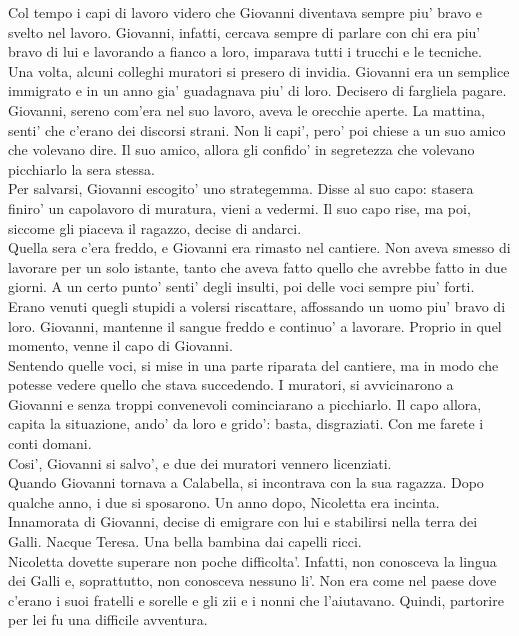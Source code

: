 Col tempo i capi di lavoro videro che Giovanni diventava sempre piu' bravo e svelto nel lavoro. Giovanni, infatti, cercava sempre di parlare con chi era piu' bravo di lui e lavorando a fianco a loro, imparava tutti i trucchi e le tecniche.\\

Una volta, alcuni colleghi muratori si presero di invidia. Giovanni era un semplice immigrato e in un anno gia' guadagnava piu' di loro. Decisero di fargliela pagare. Giovanni, sereno com'era nel suo lavoro, aveva le orecchie aperte. La mattina, senti' che c'erano dei discorsi strani. Non li capi', pero' poi chiese a un suo amico che volevano dire. Il suo amico, allora gli confido' in segretezza che volevano picchiarlo la sera stessa.\\
Per salvarsi, Giovanni escogito' uno strategemma. Disse al suo capo: stasera finiro' un capolavoro di muratura, vieni a vedermi. Il suo capo rise, ma poi, siccome gli piaceva il ragazzo, decise di andarci.\\

Quella sera c'era freddo, e Giovanni era rimasto nel cantiere. Non aveva smesso di lavorare per un solo istante, tanto che aveva fatto quello che avrebbe fatto in due giorni. A un certo punto' senti' degli insulti, poi delle voci sempre piu' forti. Erano venuti quegli stupidi a volersi riscattare, affossando un uomo piu' bravo di loro. Giovanni, mantenne il sangue freddo e continuo' a lavorare. Proprio in quel momento, venne il capo di Giovanni.\\
Sentendo quelle voci, si mise in una parte riparata del cantiere, ma in modo che potesse vedere quello che stava succedendo. I muratori, si avvicinarono a Giovanni e senza troppi convenevoli cominciarano a picchiarlo. Il capo allora, capita la situazione, ando' da loro e grido': basta, disgraziati. Con me farete i conti domani.\\
Cosi', Giovanni si salvo', e due dei muratori vennero licenziati.\\

Quando Giovanni tornava a Calabella, si incontrava con la sua ragazza. Dopo qualche anno, i due si sposarono. Un anno dopo, Nicoletta era incinta. Innamorata di Giovanni, decise di emigrare con lui e stabilirsi nella terra dei Galli. Nacque Teresa. Una bella bambina dai capelli ricci. \\
  Nicoletta dovette superare non poche difficolta'. Infatti, non conosceva la lingua dei Galli e, soprattutto, non conosceva nessuno li'. Non era come nel paese dove c'erano i suoi fratelli e sorelle e gli zii e i nonni che l'aiutavano. Quindi, partorire per lei fu una difficile avventura. \\

